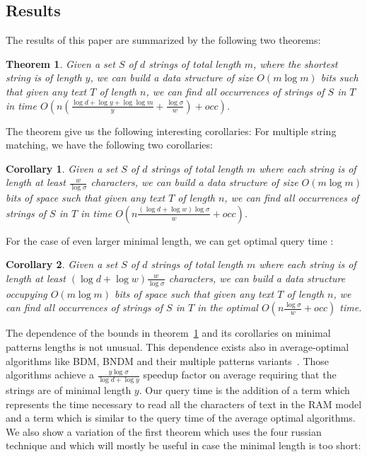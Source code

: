 \documentclass{article}
\newcommand{\?}{\mskip1.5mu}
\newtheorem{theorem}{Theorem}
\newtheorem{corollary}{Corollary}
\begin{document}
\subsection{Results} 
The results of this paper are summarized by the following two theorems: 
\begin{theorem}
\label{theorem1}
Given a set $S$ of $d$ strings of total length $m$, where the shortest string is of length $y$, we can build a data structure of size $O(m\log m)$ bits such that given any text $T$ of length $n$, we can find all occurrences of strings of $S$ in $T$ in time $O(n(\frac{\log d+\log y+\log\log m}{y}+\frac{\log\sigma}{w})+occ)$.
\end{theorem}
The theorem give us the following interesting corollaries:
For multiple string matching, we have the following two corollaries:
\begin{corollary}
\label{corollary2}
Given a set $S$ of $d$ strings of total length $m$ where each string is of length at least $\frac{w}{\log\sigma}$ characters, we can build a data structure of size $O(m\log m)$ bits of space such that given any text $T$ of length $n$, we can find all occurrences of strings of $S$ in $T$ in time $O(n\frac{(\log d+\log w)\log\sigma}{w}+occ)$.
\end{corollary}
For the case of even larger minimal length, we can get optimal query time :
\begin{corollary}
\label{corollary3}
Given a set $S$ of $d$ strings of total length $m$ where each string is of length at least $(\log d+\log w)\frac{w}{\log\sigma}$ characters, we can build a data structure occupying $O(m\log m)$ bits of space such that given any text $T$ of length $n$, we can find all occurrences of strings of $S$ in $T$ in the optimal $O(n\frac{\log\sigma}{w}+occ)$ time.
\end{corollary}  
The dependence of the bounds in theorem~\ref{theorem1} and its corollaries on minimal patterns lengths is not unusual. 
This dependence exists also in average-optimal algorithms like BDM, BNDM and their multiple patterns variants~\cite{CR94,CCGJLPR94,NR98}. Those  algorithms achieve a $\frac{y\log\sigma}{\log d+\log y}$ speedup factor on average requiring that the strings are of minimal length $y$. 
Our query time is the addition of a term which represents the time necessary to read all the characters of text in the RAM model and a term which is similar to the query time of the  average optimal algorithms. 
\\
We also show a variation of the first theorem which uses the four russian technique and which will mostly be useful in case the minimal length is too short: 
\end{document}
